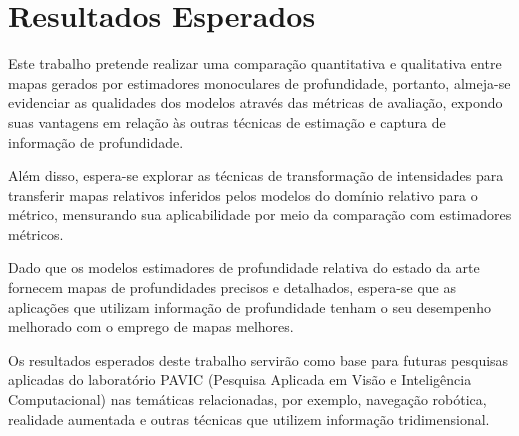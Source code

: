 \section{Resultados Esperados}

Este trabalho pretende realizar uma comparação quantitativa e qualitativa entre mapas gerados por estimadores monoculares de profundidade, portanto, almeja-se evidenciar as qualidades dos modelos através das métricas de avaliação, expondo suas vantagens em relação às outras técnicas de estimação e captura de informação de profundidade. 

Além disso, espera-se explorar as técnicas de transformação de intensidades para transferir mapas relativos inferidos pelos modelos do domínio relativo para o métrico, mensurando sua aplicabilidade por meio da comparação com estimadores métricos. 

Dado que os modelos estimadores de profundidade relativa do estado da arte fornecem mapas de profundidades precisos e detalhados, espera-se que as aplicações que utilizam informação de profundidade tenham o seu desempenho melhorado com o emprego de mapas melhores.

Os resultados esperados deste trabalho servirão como base para futuras pesquisas aplicadas do laboratório PAVIC (Pesquisa Aplicada em Visão e Inteligência Computacional) nas temáticas relacionadas, por exemplo, navegação robótica, realidade aumentada e outras técnicas que utilizem informação tridimensional.